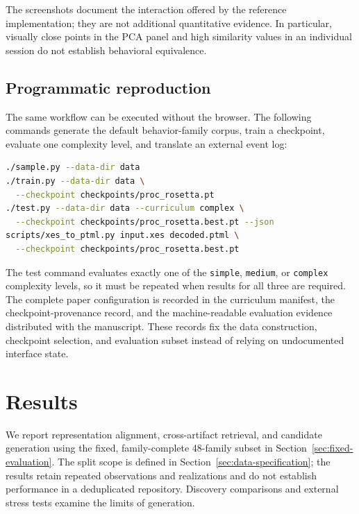 \documentclass[mathematics,article,submit,moreauthors]{Definitions/mdpi}
\begin{document}
The screenshots document the interaction offered by the reference implementation; they are not additional quantitative evidence. In particular, visually close points in the PCA panel and high similarity values in an individual session do not establish behavioral equivalence.

\subsection{Programmatic reproduction}

The same workflow can be executed without the browser. The following commands generate the default behavior-family corpus, train a checkpoint, evaluate one complexity level, and translate an external event log:

\begin{lstlisting}[language=bash,basicstyle=\ttfamily\footnotesize,breaklines=true,frame=single]
./sample.py --data-dir data
./train.py --data-dir data \
  --checkpoint checkpoints/proc_rosetta.pt
./test.py --data-dir data --curriculum complex \
  --checkpoint checkpoints/proc_rosetta.best.pt --json
scripts/xes_to_ptml.py input.xes decoded.ptml \
  --checkpoint checkpoints/proc_rosetta.best.pt
\end{lstlisting}

The test command evaluates exactly one of the \texttt{simple}, \texttt{medium}, or \texttt{complex} complexity levels, so it must be repeated when results for all three are required. The complete paper configuration is recorded in the curriculum manifest, the checkpoint-provenance record, and the machine-readable evaluation evidence distributed with the manuscript. These records fix the data construction, checkpoint selection, and evaluation subset instead of relying on undocumented interface state.

\FloatBarrier
\section{Results}\label{sec:results}

We report representation alignment, cross-artifact retrieval, and candidate generation using the fixed, family-complete 48-family subset in Section~\ref{sec:fixed-evaluation}. The split scope is defined in Section~\ref{sec:data-specification}; the results retain repeated observations and realizations and do not establish performance in a deduplicated repository. Discovery comparisons and external stress tests examine the limits of generation.
\end{document}
